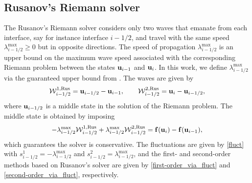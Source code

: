 \documentclass[preprint, 11pt]{article}
\newcommand{\W}{{\mathcal W}}
\newcommand{\bff}{{\bf f}}
\newcommand{\bfu}{{\bf u}}
\newcommand{\Rus}{{\rm Rus}}
\begin{document}
\subsection{Rusanov's Riemann solver}\label{sec:rusanov}
The Rusanov's Riemann solver considers only two waves that emanate from each interface,
say for instance interface $i-1/2$, and travel with the same speed $\lambda_{i-1/2}^{\max}\geq 0$
but in opposite directions.
The speed of propagation $\lambda_{i-1/2}^{\max}$ is an upper bound on the maximum wave speed
associated with the corresponding Riemann problem between the states $\bfu_{i-1}$ and $\bfu_{i}$.
In this work, we define $\lambda_{i-1/2}^{\max}$ via the guaranteed upper bound from \cite[Prop. 3.7]{azerad2017well}.
The waves are given by
\begin{align}\label{rusanov_waves}
  \W_{i-1/2}^{1,\Rus}=\bfu_{i-1/2}-\bfu_{i-1}, \qquad
  \W_{i-1/2}^{2,\Rus}=\bfu_{i}-\bfu_{i-1/2},
\end{align}
where $\bfu_{i-1/2}$ is a middle state in the solution of the Riemann problem. The middle state is obtained
by imposing
\begin{align}\label{rus_cons}
  -\lambda_{i-1/2}^{\max}\W_{i-1/2}^{1,\Rus}+\lambda_{i-1/2}^{\max}\W_{i-1/2}^{2,\Rus} = \bff(\bfu_{i})-\bff(\bfu_{i-1}),
\end{align}
which guarantees the solver is conservative.
The fluctuations are given by \eqref{fluct} with $s_{i-1/2}^1=-\lambda_{i-1/2}^{\max}$
and $s_{i-1/2}^2=\lambda_{i-1/2}^{\max}$, and the first- and second-order methods based
on Rusanov's solver are given by \eqref{first-order_via_fluct} and \eqref{second-order_via_fluct}, respectively.
\end{document}
